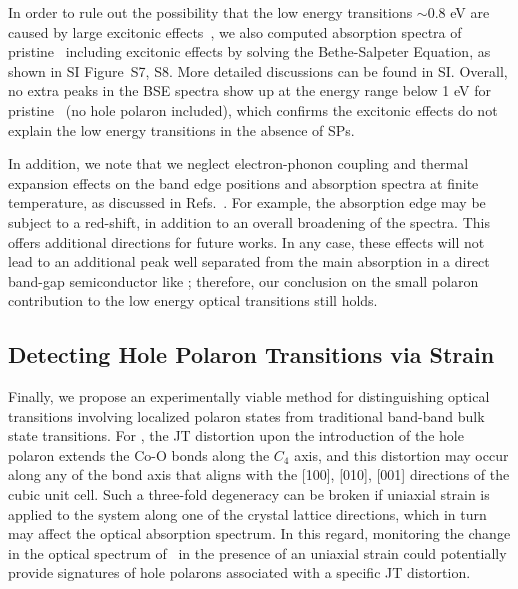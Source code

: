 In order to rule out the possibility that the low energy transitions $\sim$0.8 eV are caused by large excitonic effects~\cite{Laskowski2009,Bruneval2006,Wiktor2018,Rodl2012}, we also computed absorption spectra of pristine \co\ including excitonic effects by solving the Bethe-Salpeter Equation, as shown in SI Figure~S7, S8. More detailed discussions can be found in SI. Overall, no extra peaks in the BSE spectra show up at the energy range below 1 eV for pristine \co\ (no hole polaron included), which confirms the excitonic effects do not explain the low energy transitions in the absence of SPs.

In addition, we note that we neglect electron-phonon coupling and thermal expansion effects on the band edge positions and absorption spectra at finite temperature, as discussed in Refs.~\cite{monserrat2018phonon,bravic2019finite}. For example, the absorption edge may be subject to a red-shift, in addition to an overall broadening of the spectra. This offers additional directions for future works. In any case, these effects will not lead to an additional peak well separated from the main absorption in a direct band-gap semiconductor like \co; therefore, our conclusion on the small polaron contribution to the low energy optical transitions still holds.

\subsection{Detecting Hole Polaron Transitions via Strain}

Finally, we propose an experimentally viable method for distinguishing optical transitions involving localized polaron states from traditional band-band bulk state transitions. For \co, the JT distortion upon the introduction of the hole polaron extends the Co-O bonds along the $C_4$ axis, and this distortion may occur along any of the bond axis that aligns with the [100], [010], [001] directions of the cubic unit cell. Such a three-fold degeneracy can be broken if uniaxial strain is applied to the system along one of the crystal lattice directions, which in turn may affect the optical absorption spectrum. In this regard, monitoring the change in the optical spectrum of \co\ in the presence of an uniaxial strain could potentially provide signatures of hole polarons associated with a specific JT distortion.

